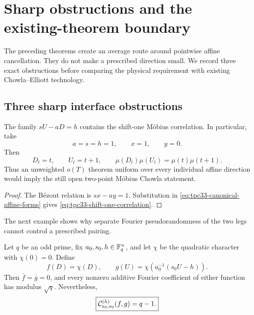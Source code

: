 \section{Sharp obstructions and the existing-theorem boundary}
\label{sec:tpc33-obstructions-literature}

The preceding theorems create an average route around pointwise affine
cancellation.  They do not make a prescribed direction small.  We record
three exact obstructions before comparing the physical requirement with
existing Chowla--Elliott technology.

\subsection{Three sharp interface obstructions}
\label{sec:tpc33-sharp-obstructions}

\begin{proposition}
\label{prop:tpc33-chowla-subcase}
The family \(sU-aD=h\) contains the shift-one M\"obius correlation.  In
particular, take
\begin{equation}
 a=s=h=1,\qquad x=1,\qquad y=0.
 \label{eq:tpc33-shift-one-parameters}
\end{equation}
Then
\begin{equation}
 D_t=t,\qquad U_t=t+1,\qquad
 \mu(D_t)\mu(U_t)=\mu(t)\mu(t+1).
 \label{eq:tpc33-shift-one-correlation}
\end{equation}
Thus an unweighted \(o(T)\) theorem uniform over every individual affine
direction would imply the still open two-point M\"obius Chowla statement.
\end{proposition}

\begin{proof}
The B\'ezout relation is \(sx-ay=1\).  Substitution in
\eqref{eq:tpc33-canonical-affine-forms} gives
\eqref{eq:tpc33-shift-one-correlation}.
\end{proof}

The next example shows why separate Fourier pseudorandomness of the two
legs cannot control a prescribed pairing.

\begin{proposition}
\label{prop:tpc33-coherent-line-counterexample}
Let \(q\) be an odd prime, fix \(a_0,s_0,h\in\mathbb F_q^\times\), and let
\(\chi\) be the quadratic character with \(\chi(0)=0\).  Define
\begin{equation}
 f(D)=\chi(D),
 \qquad
 g(U)=\chi\!\left(a_0^{-1}(s_0U-h)\right).
 \label{eq:tpc33-legendre-coherent-functions}
\end{equation}
Then \(\bar f=\bar g=0\), and every nonzero additive Fourier coefficient
of either function has modulus \(\sqrt q\).  Nevertheless,
\begin{equation}
 \boxed{
 \mathcal C_{a_0,s_0}^{(h)}(f,g)=q-1.}
 \label{eq:tpc33-legendre-coherent-line}
\end{equation}
\end{proposition}


